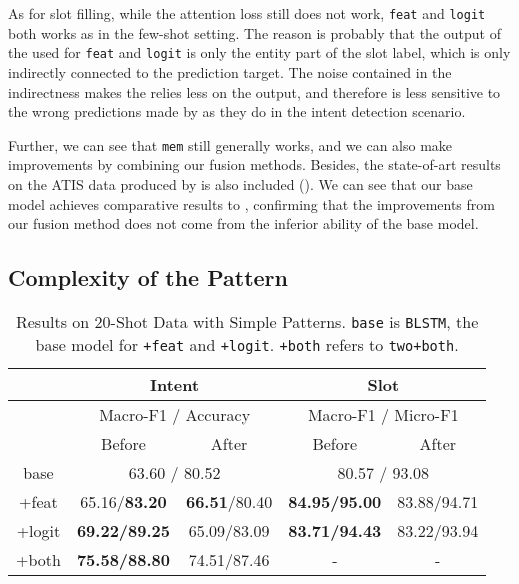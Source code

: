 As for slot filling, while the attention loss still does not work, \texttt{feat} and \texttt{logit} both works as in the few-shot setting. The reason is probably that the output of the \RE used for \texttt{feat} and \texttt{logit} is only the entity part of the slot label, which is only indirectly connected to the prediction target. The noise contained in the indirectness makes the \NN relies less on the \RE output, and therefore is less sensitive to the wrong predictions made by \RE as they do in the intent detection scenario.

Further, we can see that \texttt{mem} still generally works, and we can also make improvements by combining our fusion methods. Besides, the state-of-art results on the ATIS data produced by \cite{liu2016attention} is also included (\LL). We can see that our base \BLSTM model achieves comparative results to \LL, confirming that the improvements from our fusion method does not come from the inferior ability of the base model.

\subsection{Complexity of the Pattern}

\begin{table}
\setlength{\tabcolsep}{0.23em}
\centering
\small{
\begin{tabular}{|c|c|c|c|c|}

\hline
  & \multicolumn{2}{|c|}{Intent} & \multicolumn{2}{|c|}{Slot}  \\
\hline
  & \multicolumn{2}{|c|}{Macro-F1 / Accuracy} & \multicolumn{2}{|c|}{Macro-F1 / Micro-F1}  \\
\hline
  & Before & After & Before & After \\
\hline
base & \multicolumn{2}{|c|}{63.60 / 80.52} & \multicolumn{2}{|c|}{80.57 / 93.08}  \\
\hline
+feat & 65.16/\textbf{83.20} & \textbf{66.51}/80.40 & \textbf{84.95/95.00} & 83.88/94.71 \\
\hline
+logit & \textbf{69.22/89.25} & 65.09/83.09 & \textbf{83.71/94.43} & 83.22/93.94  \\
\hline
+both & \textbf{75.58/88.80} & 74.51/87.46 & - & - \\
\hline 
\end{tabular}
}
\caption{Results on 20-Shot Data with Simple Patterns. \texttt{base} is \texttt{BLSTM}, the base model for \texttt{+feat} and \texttt{+logit}. \texttt{+both} refers to \texttt{two+both}.}
\label{tab_simple}
\end{table}

